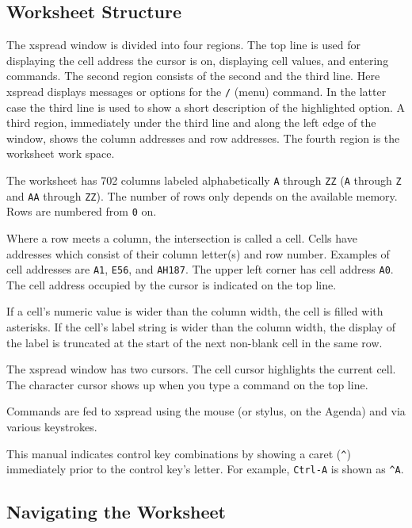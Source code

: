 \documentclass[titlepage]{article}
\newcommand{\ctrl}[1]{\texttt{\^{}#1}}
\begin{document}
\subsection{Worksheet Structure}

The \textsf{xspread} window is divided into four regions.
The top line is used for displaying the cell address the cursor is on,
displaying cell values, and entering commands.  The second region
consists of the second and the third line. Here \textsf{xspread}
displays messages or options for the \texttt{/} (menu) command. In the
latter case the third line is used to show a short description of the
highlighted option.  A third region, immediately under the third line
and along the left edge of the window, shows the column addresses and
row addresses.  The fourth region is the worksheet work space.

The worksheet has 702 columns labeled alphabetically \texttt{A}
through \texttt{ZZ} (\texttt{A} through \texttt{Z} and \texttt{AA}
through \texttt{ZZ}).  The number of rows only depends on the
available memory. Rows are numbered from \texttt{0} on.

Where a row meets a column, the intersection is called a cell.  Cells
have addresses which consist of their column letter(s) and row number.
Examples of cell addresses are \texttt{A1}, \texttt{E56}, and
\texttt{AH187}.  The upper left corner has cell address \texttt{A0}.
The cell address occupied by the cursor is indicated on the top line.

If a cell's numeric value is wider than the column width, the cell is
filled with asterisks.  If the cell's label string is wider than the
column width, the display of the label is truncated at the start of
the next non-blank cell in the same row.

The \textsf{xspread} window has two cursors.  The cell cursor
highlights the current cell.  The character cursor shows up when you
type a command on the top line.

Commands are fed to \textsf{xspread} using the mouse (or stylus, on
the Agenda) and via various keystrokes.

This manual indicates control key combinations by showing a caret
(\ctrl{}) immediately prior to the control key's letter.  For example,
\texttt{Ctrl-A} is shown as \ctrl{A}.

\subsection{Navigating the Worksheet}
\end{document}
